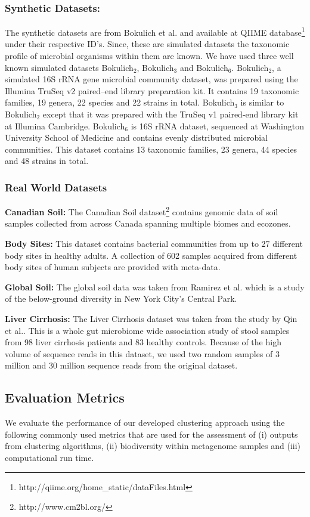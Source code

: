 \documentclass[letterpaper,twocolumn]{article}
\begin{document}
\subsubsection{Synthetic Datasets:}
The synthetic datasets are from Bokulich et al.\cite{MARmockDatasetRef} and 
available at QIIME database\footnote{http://qiime.org/home\_static/dataFiles.html} under their respective ID's. Since, these are simulated datasets the taxonomic profile of microbial organisms within them are known. We have used three well known simulated datasets Bokulich$_2$, Bokulich$_3$ and Bokulich$_6$. Bokulich$_2$, a simulated 16S rRNA gene microbial community dataset, was prepared using the Illumina TruSeq v2 paired--end library preparation kit. It contains 19 taxonomic families, 19 genera, 22 species and 22 strains in total. Bokulich$_3$ is similar to Bokulich$_2$ except that it was prepared with the TruSeq v1 paired-end library kit at Illumina Cambridge. Bokulich$_6$ is 16S rRNA dataset, sequenced at Washington University School of Medicine and contains evenly distributed microbial communities. This dataset contains 13 taxonomic families, 23 genera, 44 species and 48 strains in total.

\subsubsection{Real World Datasets}
\textbf{Canadian Soil:}
The Canadian Soil dataset\footnote{http://www.cm2bl.org/} contains genomic data of soil samples collected from across Canada spanning multiple biomes and ecozones.

\textbf{Body Sites:}
This dataset contains bacterial communities from up to 27 different body sites in healthy adults. A collection of 602 samples acquired from different body sites of human subjects are provided with meta-data.

\textbf{Global Soil:}
The global soil data was taken from Ramirez et al.\cite{MARglobalSoil} which is a study of the below-ground diversity in New York City's Central Park.

\textbf{Liver Cirrhosis:}
The Liver Cirrhosis dataset was taken from the study by Qin et al.\cite{qin2014alterations}. This is 
a whole gut microbiome wide association study of stool samples from 98 liver cirrhosis patients and 83 
healthy controls. Because of the high volume of sequence reads in this dataset, we used two random samples of 3 million and 30 million sequence reads from the original dataset.  

\subsection{Evaluation Metrics}
We evaluate the performance of our developed clustering approach using 
the following commonly used metrics that are used 
for the assessment of (i) outputs from clustering algorithms, (ii) biodiversity
within metagenome samples and (iii) computational run time. 
\end{document}
